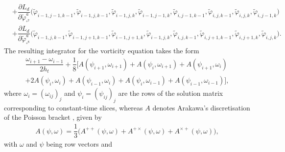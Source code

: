 \documentclass[12pt,a4paper,reqno]{article}
\begin{document}
\begin{align}
\nonumber
&+ \dfrac{\partial L_d}{\partial \tilde{\ensuremath{\varphi}}^{a}_{\square^7}} \Big( \tilde{\ensuremath{\varphi}}_{i-1,j-1,k-1}, \tilde{\ensuremath{\varphi}}_{i-1,j,  k-1}, \tilde{\ensuremath{\varphi}}_{i-1,j,  k  }, \tilde{\ensuremath{\varphi}}_{i-1,j-1,k  }, \tilde{\ensuremath{\varphi}}_{i,  j-1,k-1}, \tilde{\ensuremath{\varphi}}_{i,  j,  k-1}, \tilde{\ensuremath{\varphi}}_{i,  j,  k  }, \tilde{\ensuremath{\varphi}}_{i,  j-1,k  } \Big) \\
&+ \dfrac{\partial L_d}{\partial \tilde{\ensuremath{\varphi}}^{a}_{\square^8}} \Big( \tilde{\ensuremath{\varphi}}_{i-1,j  ,k-1}, \tilde{\ensuremath{\varphi}}_{i-1,j+1,k-1}, \tilde{\ensuremath{\varphi}}_{i-1,j+1,k  }, \tilde{\ensuremath{\varphi}}_{i-1,j,  k  }, \tilde{\ensuremath{\varphi}}_{i,  j,  k-1}, \tilde{\ensuremath{\varphi}}_{i,  j+1,k-1}, \tilde{\ensuremath{\varphi}}_{i,  j+1,k  }, \tilde{\ensuremath{\varphi}}_{i,  j,  k  } \Big) .
\end{align}
\endgroup
The resulting integrator for the vorticity equation takes the form
\begin{multline}\label{eq:vorticity_integrator}
\dfrac{\omega_{i+1} - \omega_{i-1}}{2 h_{t}}
+ \dfrac{1}{8} \Big[ A (\psi_{i+1}, \omega_{i+1}) + A (\psi_{i}, \omega_{i+1}) + A (\psi_{i+1}, \omega_{i}) \\
+ 2 A(\psi_{i}, \omega_{i}) + A(\psi_{i-1}, \omega_{i}) + A (\psi_{i}, \omega_{i-1}) + A (\psi_{i-1}, \omega_{i-1}) \Big] ,
\end{multline}
where $\omega_{i} = (\omega_{ij})_{j}$ and $\psi_{i} = (\psi_{ij})_{j}$ are the rows of the solution matrix corresponding to constant-time slices, whereas $A$ denotes Arakawa's discretisation of the Poisson bracket \cite{Arakawa:1966}, given by
\begin{align}\label{eq:brackets_poisson_arakawa_5}
A (\psi, \omega) = \dfrac{1}{3} \Big( A^{++} (\psi, \omega) + A^{+ \times} (\psi, \omega) + A^{\times +} (\psi, \omega) \Big) ,
\end{align}
with $\omega$ and $\psi$ being row vectors and
\begingroup
\allowdisplaybreaks
\end{document}
